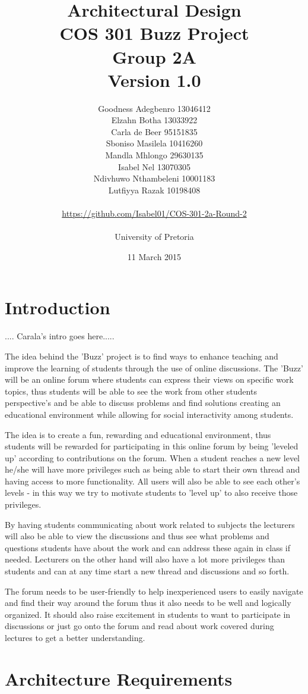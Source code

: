 \documentclass[a4paper]{article}
\title{Architectural Design
\\COS 301 Buzz Project
\\Group 2A
\\Version 1.0}
\author{Goodness Adegbenro 13046412
\\Elzahn Botha 13033922
\\Carla de Beer 95151835
\\Sboniso Masilela 10416260
\\Mandla Mhlongo 29630135
\\Isabel Nel 13070305
\\Ndivhuwo Nthambeleni 10001183
\\Lutfiyya Razak 10198408
\\
\\
\url{https://github.com/Isabel01/COS-301-2a-Round-2}
\\
\\ University of Pretoria}
\date{11 March 2015}
\begin{document}
\maketitle
\newpage


\tableofcontents
\newpage

\section{Introduction}
.... Carala's intro goes here.....

The idea behind the 'Buzz' project is to find ways to enhance teaching and improve the learning of students through the use of online discussions.  The 'Buzz' will be an online forum where students can express their views on specific work topics, thus students will be able to see the work from other students perspective's and be able to discuss problems and find solutions creating an educational environment while allowing for social interactivity among students.

The idea is to create a fun, rewarding and educational environment, thus students will be rewarded for participating in this online forum by being 'leveled up' according to contributions on the forum. When a student reaches a new level he/she will have more privileges such as being able to start their own thread and having access to more functionality. All users will also be able to see each other's levels - in this way we try to motivate students to 'level up' to also receive those privileges.   

By having students communicating about work related to subjects the lecturers will also be able to view the discussions and thus see what problems and questions students have about the work and can address these again in class if needed. Lecturers on the other hand will also have a lot more privileges than students and can at any time start a new thread and discussions and so forth. 

The forum needs to be user-friendly to help inexperienced users to easily navigate and find their way around the forum thus it also needs to be well and logically organized. It should also raise excitement in students to want to participate in discussions or just go onto the forum and read about work covered during lectures to get a better understanding. 


\section{Architecture Requirements}
\end{document}

